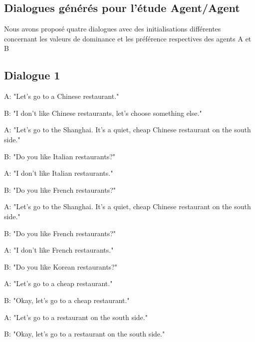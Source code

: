 \begin{appendix}

\section{Dialogues générés pour l'étude Agent/Agent}
\label{annexe:crowd}
	Nous avons proposé quatre dialogues avec des initialisations différentes concernant les valeurs de dominance et les préférence respectives des agents A et B
	
	\subsection{Dialogue 1}
		\begin{minipage}{\textwidth}
			{\ttfamily
				\begin{addmargin}[1em]{2em}%
					A: "Let's go to a Chinese restaurant."
					
					\hspace*{3mm}B: "I don't like Chinese restaurants, let's choose something else."
					
					A: "Let's go to the Shanghai. It's a quiet, cheap Chinese restaurant on the south side."
					
					\hspace*{3mm}B: "Do you like Italian restaurants?"
					
					A: "I don't like Italian restaurants."
					
					\hspace*{3mm}B: "Do you like French restaurants?"
					
					A: "Let's go to the Shanghai. It's a quiet, cheap Chinese restaurant on the south side."
					
					\hspace*{3mm}B: "Do you like French restaurants?"
					
					A: "I don't like French restaurants."
					
					\hspace*{3mm}B: "Do you like Korean restaurants?"
					
					A: "Let's go to a cheap restaurant."
					
					\hspace*{3mm}B: "Okay, let's go to a cheap restaurant."
					
					A: "Let's go to a restaurant on the south side."
					
					\hspace*{3mm}B: "Okay, let's go to a restaurant on the south side."
					

\end{addmargin}}
\end{minipage}
\end{appendix}
